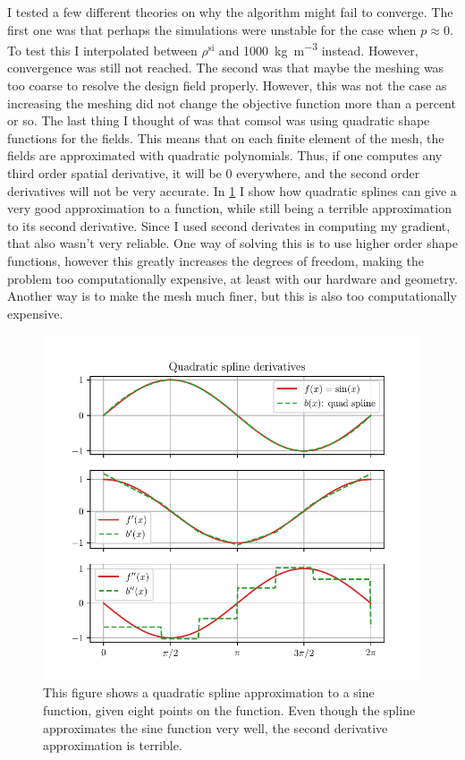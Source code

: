 I tested a few different theories on why the algorithm might fail to converge.
The first one was that perhaps the simulations were unstable for the case when
$p\approx 0$. To test this I interpolated between $\rho^\text{si}$ and
\qty{1000}{\kg\per\m^3} instead. However, convergence was still not reached.
The second was that maybe the meshing was too coarse to resolve the design
field properly. However, this was not the case as increasing the meshing did not
change the objective function more than a percent or so.
The last thing I thought of was that comsol was using quadratic shape functions
for the fields. This means that on each finite element of the mesh, the fields
are approximated with quadratic polynomials. Thus, if one computes any third
order spatial derivative, it will be 0 everywhere, and the second order
derivatives will not be very accurate.
In \cref{fig:quad_spline_sine} I show how quadratic splines can give a very good
approximation to a function, while still being a terrible approximation to its
second derivative.
Since I used second derivates in computing my gradient, that also wasn't very
reliable.
One way of solving this is to use higher order shape functions, however this
greatly increases the degrees of freedom, making the problem too computationally
expensive, at least with our hardware and geometry.
Another way is to make the mesh much finer, but this is also too computationally
expensive.
\begin{figure}[htpb]
	\centering
	\includegraphics{chapters/results/quad_spline_sine.pdf}
	\caption{%
		This figure shows a quadratic spline approximation to a sine function,
		given eight points on the function. Even though the spline approximates
		the sine function very well, the second derivative approximation is
		terrible.
	}%
	\label{fig:quad_spline_sine}
\end{figure}

